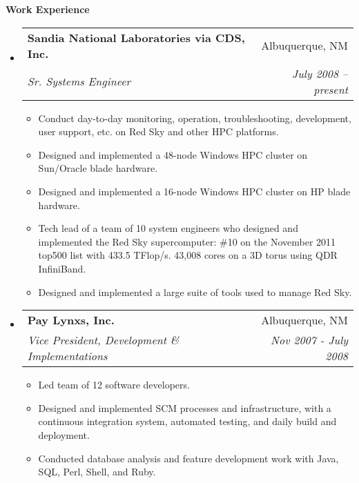 \documentclass[letterpaper,10pt]{article}
\makeatletter
\newcommand{\resitem}[1]{\item #1 \vspace{-2pt}}
\newcommand{\resheading}[1]{{\large{\colorbox{MyGrey}{\textbf{\fontfamily{phv}\selectfont #1 \vphantom{p\^{E}}}}}}}
\newcommand{\ressubheading}[4]{
\begin{tabular*}{6.5in}{l@{\extracolsep{\fill}}r}
		\textbf{#1} & #2 \\
		\textit{#3} & \textit{#4} \\
\end{tabular*}\vspace{-6pt}}
\makeatother
\begin{document}
\resheading{Work Experience}
\begin{itemize}
\item
    \ressubheading{Sandia National Laboratories via CDS, Inc.}{Albuquerque, NM}{Sr. Systems Engineer}{July 2008 -- present}
    \begin{itemize}
        \resitem{Conduct day-to-day monitoring, operation, troubleshooting, development, user support, etc. on Red Sky and other HPC platforms.}
        \resitem{Designed and implemented a 48-node Windows HPC cluster on Sun/Oracle blade hardware.}
        \resitem{Designed and implemented a 16-node Windows HPC cluster on HP blade hardware.}
        \resitem{Tech lead of a team of 10 system engineers who designed and implemented the Red Sky supercomputer: \#10 on the November 2011 top500 list with 433.5 TFlop/s.  43,008 cores on a 3D torus using QDR InfiniBand.}
        \resitem{Designed and implemented a large suite of tools used to manage Red Sky.}
    \end{itemize}
\item
    \ressubheading{Pay Lynxs, Inc.}{Albuquerque, NM}{Vice President, Development \& Implementations}{Nov 2007 - July 2008}
    \begin{itemize}
        \resitem{Led team of 12 software developers.}
        \resitem{Designed and implemented SCM processes and infrastructure, with a continuous integration system, automated testing, and daily build and deployment.}
        \resitem{Conducted database analysis and feature development work with Java, SQL, Perl, Shell, and Ruby.}
    \end{itemize}


\end{itemize}
\end{document}
